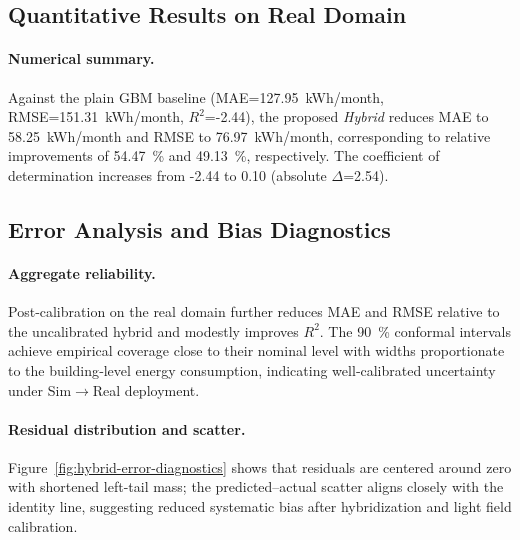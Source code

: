 ﻿\documentclass{article}
\begin{document}
\subsection{Quantitative Results on Real Domain}
\paragraph{Numerical summary.} Against the plain GBM baseline (MAE=127.95~kWh/month, RMSE=151.31~kWh/month, $R^2$=-2.44), the proposed \emph{Hybrid} reduces MAE to 58.25~kWh/month and RMSE to 76.97~kWh/month, corresponding to relative improvements of 54.47~\% and 49.13~\%, respectively. The coefficient of determination increases from -2.44 to 0.10 (absolute $\Delta$=2.54).
\label{subsec:real_results}
\begin{table}[t]
  \centering
  \caption{Main-task performance on real projects (LOPO across buildings). Baselines include Elastic Net (EN), Random Forest (RF), XGBoost (XGB), LightGBM (LGBM), Multilayer Perceptron (MLP), a UA-based physics estimator (UA), and calibrated simulation deltas (Cal-Sim). Hybrid is our proposed stack. Metrics: MAE and RMSE measured in kWh/month per building, coefficient of determination ($R^2$), CV(RMSE), and NMBE.}
  \label{tab:real_results}
  
\end{table}

\subsection{Error Analysis and Bias Diagnostics}
\label{subsec:error_analysis}
\paragraph{Aggregate reliability.}
Post‑calibration on the real domain further reduces MAE and RMSE relative to the uncalibrated hybrid and modestly improves $R^2$. The 90~\% conformal intervals achieve empirical coverage close to their nominal level with widths proportionate to the building‑level energy consumption, indicating well‑calibrated uncertainty under Sim$\rightarrow$Real deployment.

\paragraph{Residual distribution and scatter.}
Figure~\ref{fig:hybrid-error-diagnostics} shows that residuals are centered around zero with shortened left-tail mass; the predicted--actual scatter aligns closely with the identity line, suggesting reduced systematic bias after hybridization and light field calibration.
\end{document}
